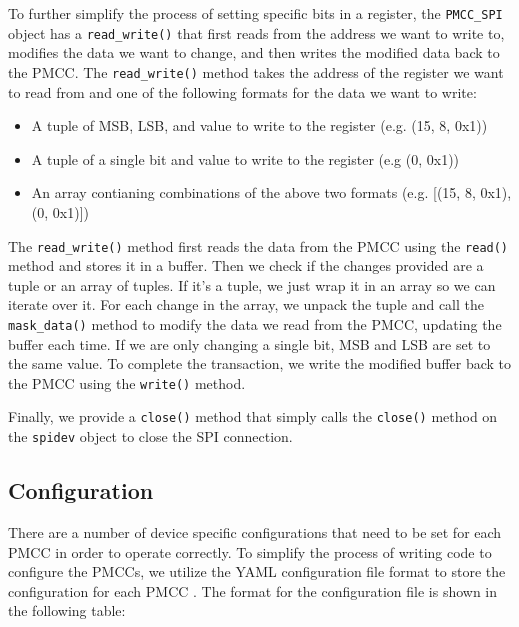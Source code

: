 To further simplify the process of setting specific bits in a register, the \verb|PMCC_SPI| object has a \verb|read_write()| that first reads from the address we want to write to, modifies the data we want to change, and then writes the modified data back to the PMCC.
The \verb|read_write()| method takes the address of the register we want to read from and one of the following formats for the data we want to write:
\begin{itemize}
    \item A tuple of MSB, LSB, and value to write to the register (e.g. (15, 8, 0x1))
    \item A tuple of a single bit and value to write to the register (e.g (0, 0x1))
    \item An array contianing combinations of the above two formats (e.g. [(15, 8, 0x1), (0, 0x1)])
\end{itemize}
The \verb|read_write()| method first reads the data from the PMCC using the \verb|read()| method and stores it in a buffer.
Then we check if the changes provided are a tuple or an array of tuples.
If it's a tuple, we just wrap it in an array so we can iterate over it.
For each change in the array, we unpack the tuple and call the \verb|mask_data()| method to modify the data we read from the PMCC, updating the buffer each time.
If we are only changing a single bit, MSB and LSB are set to the same value.
To complete the transaction, we write the modified buffer back to the PMCC using the \verb|write()| method.

Finally, we provide a \verb|close()| method that simply calls the \verb|close()| method on the \verb|spidev| object to close the SPI connection.

\subsection{Configuration}
There are a number of device specific configurations that need to be set for each PMCC in order to operate correctly.
To simplify the process of writing code to configure the PMCCs, we utilize the YAML configuration file format to store the configuration for each PMCC \cite{yaml}.
The format for the configuration file is shown in the following table:
